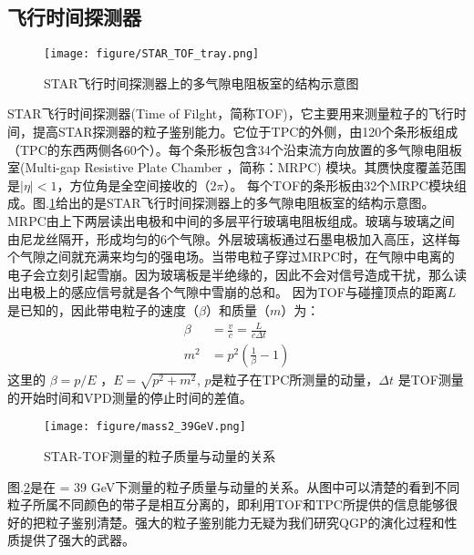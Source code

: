 \subsection{飞行时间探测器}

\begin{figure}[htbp]
\centering
\texttt{[image: figure/STAR\_TOF\_tray.png]}
\caption{STAR飞行时间探测器上的多气隙电阻板室的结构示意图\cite{llope2005large}}
\label{fig:tof_mrpc_view}
\end{figure}

STAR飞行时间探测器(Time of Filght，简称TOF)\cite{llope2005large}，它主要用来测量粒子的飞行时间，提高STAR探测器的粒子鉴别能力。它位于TPC的外侧，由120个条形板组成\cite{llope2005large}（TPC的东西两侧各60个）。每个条形板包含34个沿束流方向放置的多气隙电阻板室(Multi-gap Resistive Plate Chamber ，简称：MRPC) 模块\cite{llope2005large}。其赝快度覆盖范围是$|\eta|<1$，方位角是全空间接收的（$2\pi$）。
每个TOF的条形板由32个MRPC模块组成。图.\ref{fig:tof_mrpc_view}给出的是STAR飞行时间探测器上的多气隙电阻板室的结构示意图。
MRPC由上下两层读出电极和中间的多层平行玻璃电阻板组成\cite{llope2005large}。玻璃与玻璃之间由尼龙丝隔开，形成均匀的6个气隙。外层玻璃板通过石墨电极加入高压，这样每个气隙之间就充满来均匀的强电场。当带电粒子穿过MRPC时，在气隙中电离的电子会立刻引起雪崩。因为玻璃板是半绝缘的，因此不会对信号造成干扰，那么读出电极上的感应信号就是各个气隙中雪崩的总和。
因为TOF与碰撞顶点的距离$L$是已知的，因此带电粒子的速度（$\beta$）和质量（$m$）为：
\begin{align}
\beta &= \frac{v}{c}=\frac{L}{c\Delta t}\\
m^{2}&=p^{2}(\frac{1}{\beta}-1)
\end{align}
这里的 $\beta = p/E $ ，$E = \sqrt{p^{2} + m^{2}}$,  $p$是粒子在TPC所测量的动量，$\Delta t$ 是TOF测量的开始时间和VPD测量的停止时间的差值。
\begin{figure}[htbp]
\centering
\texttt{[image: figure/mass2\_39GeV.png]}
\caption{STAR-TOF测量的粒子质量与动量的关系}
\label{fig:tof_beta}
\end{figure}

图.\ref{fig:tof_beta}是在 {\sNN} = 39 GeV下测量的粒子质量与动量的关系。从图中可以清楚的看到不同粒子所属不同颜色的带子是相互分离的，即利用TOF和TPC所提供的信息能够很好的把粒子鉴别清楚。强大的粒子鉴别能力无疑为我们研究QGP的演化过程和性质提供了强大的武器。



